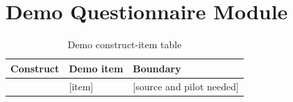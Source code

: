 \section{Demo Questionnaire Module}

\begin{table}[htbp]
\centering
\caption{Demo construct-item table}
\begin{tabularx}{\textwidth}{P{3cm}Y Y}
\toprule
\textbf{Construct} & \textbf{Demo item} & \textbf{Boundary} \\
\midrule
[construct] & [item] & [source and pilot needed] \\
\bottomrule
\end{tabularx}
\end{table}
